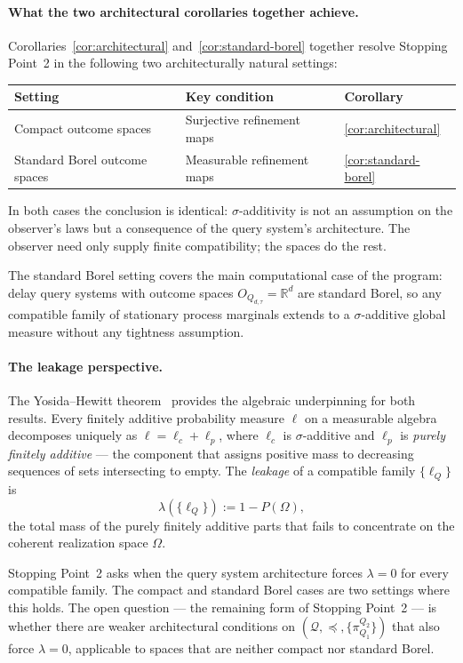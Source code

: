 \documentclass[11pt]{article}
\theoremstyle{definition}
\newcommand{\Qcal}{\mathcal{Q}}
\begin{document}
\paragraph{What the two architectural corollaries together achieve.}
Corollaries~\ref{cor:architectural} and~\ref{cor:standard-borel}
together resolve Stopping Point~2 in the following two architecturally
natural settings:

\begin{center}
\begin{tabular}{lll}
\toprule
Setting & Key condition & Corollary \\
\midrule
Compact outcome spaces & Surjective refinement maps & \ref{cor:architectural} \\
Standard Borel outcome spaces & Measurable refinement maps & \ref{cor:standard-borel} \\
\bottomrule
\end{tabular}
\end{center}

In both cases the conclusion is identical: $\sigma$-additivity is not
an assumption on the observer's laws but a consequence of the query
system's architecture.  The observer need only supply finite
compatibility; the spaces do the rest.

The standard Borel setting covers the main computational case of the
program: delay query systems with outcome spaces $O_{Q_{d,\tau}}
= \mathbb{R}^d$ are standard Borel, so any compatible family of
stationary process marginals extends to a $\sigma$-additive global
measure without any tightness assumption.

\paragraph{The leakage perspective.}
The Yosida--Hewitt theorem~\cite{Dunford1958} provides the
algebraic underpinning for both results.  Every finitely additive
probability measure $\ell$ on a measurable algebra decomposes
uniquely as $\ell = \ell_c + \ell_p$, where $\ell_c$ is
$\sigma$-additive and $\ell_p$ is \emph{purely finitely additive}
--- the component that assigns positive mass to decreasing sequences
of sets intersecting to empty.  The \emph{leakage} of a compatible
family $\{\ell_Q\}$ is
\[
\lambda(\{\ell_Q\}) := 1 - P(\Omega),
\]
the total mass of the purely finitely additive parts that fails to
concentrate on the coherent realization space $\Omega$.

Stopping Point~2 asks when the query system architecture forces
$\lambda = 0$ for every compatible family.  The compact and standard
Borel cases are two settings where this holds.  The open question ---
the remaining form of Stopping Point~2 --- is whether there are
weaker architectural conditions on $(\Qcal, \preceq,
\{\pi^{Q_2}_{Q_1}\})$ that also force $\lambda = 0$, applicable
to spaces that are neither compact nor standard Borel.
\end{document}
